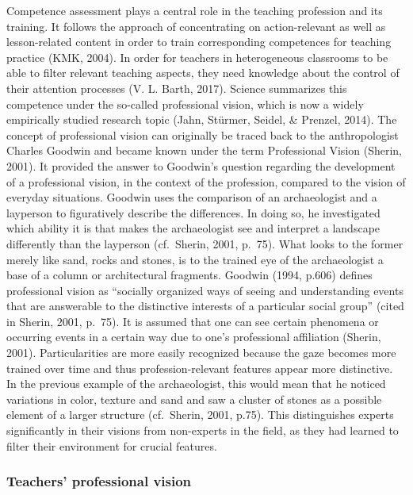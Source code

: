 \documentclass[
  man]{apa6}
\begin{document}
Competence assessment plays a central role in the teaching profession and its training. It follows the approach of concentrating on action-relevant as well as lesson-related content in order to train corresponding competences for teaching practice (KMK, 2004). In order for teachers in heterogeneous classrooms to be able to filter relevant teaching aspects, they need knowledge about the control of their attention processes (V. L. Barth, 2017). Science summarizes this competence under the so-called professional vision, which is now a widely empirically studied research topic (Jahn, Stürmer, Seidel, \& Prenzel, 2014). The concept of professional vision can originally be traced back to the anthropologist Charles Goodwin and became known under the term Professional Vision (Sherin, 2001). It provided the answer to Goodwin's question regarding the development of a professional vision, in the context of the profession, compared to the vision of everyday situations. Goodwin uses the comparison of an archaeologist and a layperson to figuratively describe the differences. In doing so, he investigated which ability it is that makes the archaeologist see and interpret a landscape differently than the layperson (cf.~Sherin, 2001, p.~75). What looks to the former merely like sand, rocks and stones, is to the trained eye of the archaeologist a base of a column or architectural fragments. Goodwin (1994, p.606) defines professional vision as ``socially organized ways of seeing and understanding events that are answerable to the distinctive interests of a particular social group'' (cited in Sherin, 2001, p.~75). It is assumed that one can see certain phenomena or occurring events in a certain way due to one's professional affiliation (Sherin, 2001). Particularities are more easily recognized because the gaze becomes more trained over time and thus profession-relevant features appear more distinctive. In the previous example of the archaeologist, this would mean that he noticed variations in color, texture and sand and saw a cluster of stones as a possible element of a larger structure (cf.~Sherin, 2001, p.75). This distinguishes experts significantly in their visions from non-experts in the field, as they had learned to filter their environment for crucial features.

\subsubsection{Teachers' professional vision}\label{teachers-professional-vision}
\end{document}
